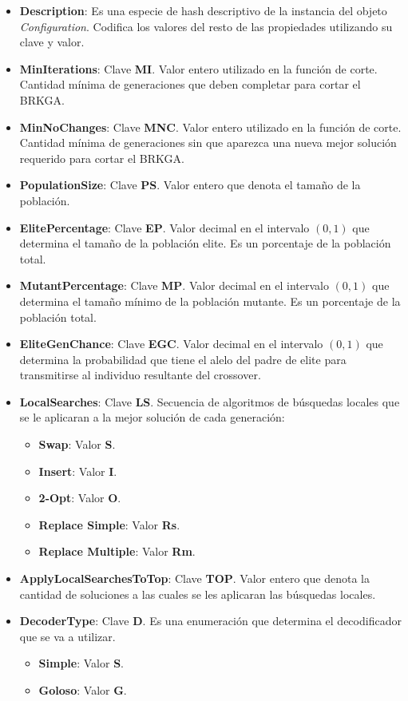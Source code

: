 \begin{itemize}
  \item \textbf{Description}: Es una especie de hash descriptivo de la instancia del objeto \textit{Configuration}. Codifica los valores del resto de las propiedades utilizando su clave y valor.
  \item \textbf{MinIterations}: Clave \textbf{MI}. Valor entero utilizado en la función de corte. Cantidad mínima de generaciones que deben completar para cortar el BRKGA. 
  \item \textbf{MinNoChanges}: Clave \textbf{MNC}. Valor entero utilizado en la función de corte. Cantidad mínima de generaciones sin que aparezca una nueva mejor solución requerido para cortar el BRKGA.
  \item \textbf{PopulationSize}: Clave \textbf{PS}. Valor entero que denota el tamaño de la población.
  \item \textbf{ElitePercentage}: Clave \textbf{EP}. Valor decimal en el intervalo $(0, 1)$ que determina el tamaño de la población elite. Es un porcentaje de la población total.
  \item \textbf{MutantPercentage}: Clave \textbf{MP}. Valor decimal en el intervalo $(0, 1)$ que determina el tamaño mínimo de la población mutante. Es un porcentaje de la población total.
  \item \textbf{EliteGenChance}: Clave \textbf{EGC}. Valor decimal en el intervalo $(0, 1)$ que determina la probabilidad que tiene el alelo del padre de elite para transmitirse al individuo resultante del crossover.
  \item \textbf{LocalSearches}: Clave \textbf{LS}. Secuencia de algoritmos de búsquedas locales que se le aplicaran a la mejor solución de cada generación:
	\begin{itemize}
		\item \textbf{Swap}: Valor \textbf{S}.
		\item \textbf{Insert}: Valor \textbf{I}.
		\item \textbf{2-Opt}: Valor \textbf{O}.
		\item \textbf{Replace Simple}: Valor \textbf{Rs}.
		\item \textbf{Replace Multiple}: Valor \textbf{Rm}.
	\end{itemize}  
  \item \textbf{ApplyLocalSearchesToTop}: Clave \textbf{TOP}. Valor entero que denota la cantidad de soluciones a las cuales se les aplicaran las búsquedas locales.
  \item \textbf{DecoderType}: Clave \textbf{D}. Es una enumeración que determina el decodificador que se va a utilizar.
	\begin{itemize}
		\item \textbf{Simple}: Valor \textbf{S}.
		\item \textbf{Goloso}: Valor \textbf{G}.
	\end{itemize}  
\end{itemize}

